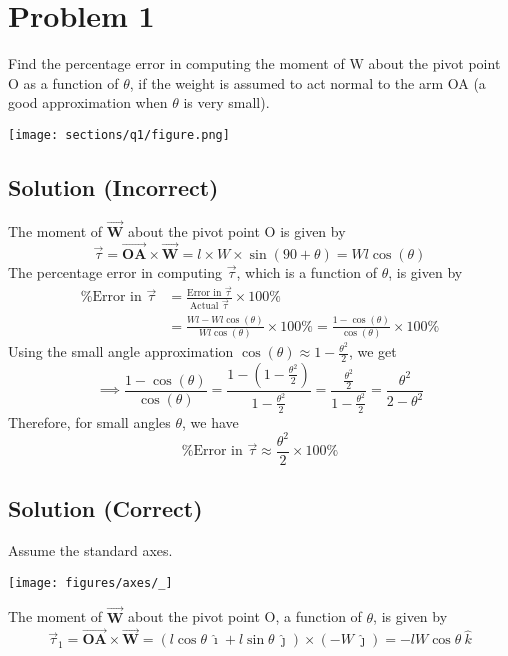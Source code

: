 \section*{Problem 1}

Find the percentage error in computing the moment of W about the pivot point O as a function of \( \theta \), if the weight is assumed to act normal to the arm OA (a good approximation when \( \theta \) is very small).

\begin{figure*}[h]
    \centering
    \texttt{[image: sections/q1/figure.png]}
\end{figure*}

\subsection*{Solution (Incorrect)}

The moment of \( \vec{\mathbf{W}} \) about the pivot point O is given by
\[
    \vec{\tau} = \vec{\mathbf{OA}} \times \vec{\mathbf{W}}
    = l \times W \times \sin(90 + \theta)
    = W l \cos(\theta)
\]
The percentage error in computing \( \vec{\tau} \), which is a function of \( \theta \),  is given by
\begin{align*}
    \text{\%Error in } \vec{\tau}
     & =
    \frac{\text{Error in }\vec{\tau}}{\text{Actual }\vec{\tau}} \times 100\% \\
     & = \frac{W l - W l \cos(\theta)}{W l \cos(\theta)} \times 100\%
    = \frac{1 - \cos(\theta)}{\cos(\theta)} \times 100\%
\end{align*}
Using the small angle approximation \( \cos(\theta) \approx 1 - \frac{\theta^2}{2} \), we get
\[
    \implies \frac{1 - \cos(\theta)}{\cos(\theta)}
    = \frac{1 - (1 - \frac{\theta^2}{2})}{1 - \frac{\theta^2}{2}}
    = \frac{\frac{\theta^2}{2}}{1 - \frac{\theta^2}{2}}
    = \frac{\theta^2}{2 - \theta^2}
\]
Therefore, for small angles \( \theta \), we have
\[
    \boxed{
        \text{\%Error in } \vec{\tau} \approx \frac{\theta^2}{2} \times 100\%
    }
\]

\subsection*{Solution (Correct)}

Assume the standard axes.
\vspace{-2em}
\begin{center}
    \texttt{[image: figures/axes/\_]}
\end{center}
\vspace{-1em}
The moment of \( \vec{\mathbf{W}} \) about the pivot point O, a function of \( \theta \), is given by
\[
    \vec{\tau}_1 = \vec{\mathbf{OA}} \times \vec{\mathbf{W}}
    = (l \cos \theta \ \hat{\imath} + l \sin \theta \ \hat{\jmath}) \times (- W \ \hat{\jmath})
    = -lW \cos \theta \ \hat{k}
\]


